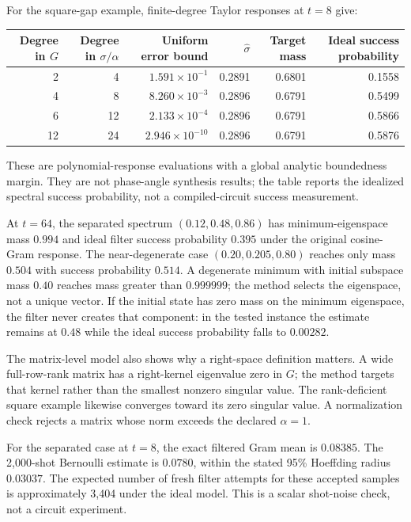 \documentclass[11pt]{article}
\begin{document}
For the square-gap example, finite-degree Taylor responses at $t=8$ give:
\begin{center}
\small
\begin{tabular}{rrrrrr}
\toprule
Degree in $G$ & Degree in $\sigma/\alpha$ & Uniform error bound & $\widehat\sigma$ & Target mass & Ideal success probability\\
\midrule
2 & 4 & $1.591\times10^{-1}$ & 0.2891 & 0.6801 & 0.1558\\
4 & 8 & $8.260\times10^{-3}$ & 0.2896 & 0.6791 & 0.5499\\
6 & 12 & $2.133\times10^{-4}$ & 0.2896 & 0.6791 & 0.5866\\
12 & 24 & $2.946\times10^{-10}$ & 0.2896 & 0.6791 & 0.5876\\
\bottomrule
\end{tabular}
\end{center}
\noindent These are polynomial-response evaluations with a global analytic boundedness margin. They are not phase-angle synthesis results; the table reports the idealized spectral success probability, not a compiled-circuit success measurement.

At $t=64$, the separated spectrum $(0.12,0.48,0.86)$ has minimum-eigenspace mass $0.994$ and ideal filter success probability $0.395$ under the original cosine-Gram response. The near-degenerate case $(0.20,0.205,0.80)$ reaches only mass $0.504$ with success probability $0.514$. A degenerate minimum with initial subspace mass $0.40$ reaches mass greater than $0.999999$; the method selects the eigenspace, not a unique vector. If the initial state has zero mass on the minimum eigenspace, the filter never creates that component: in the tested instance the estimate remains at $0.48$ while the ideal success probability falls to $0.00282$.

The matrix-level model also shows why a right-space definition matters. A wide full-row-rank matrix has a right-kernel eigenvalue zero in $G$; the method targets that kernel rather than the smallest nonzero singular value. The rank-deficient square example likewise converges toward its zero singular value. A normalization check rejects a matrix whose norm exceeds the declared $\alpha=1$.

For the separated case at $t=8$, the exact filtered Gram mean is $0.08385$. The 2,000-shot Bernoulli estimate is $0.0780$, within the stated 95\% Hoeffding radius $0.03037$. The expected number of fresh filter attempts for these accepted samples is approximately 3,404 under the ideal model. This is a scalar shot-noise check, not a circuit experiment.
\end{document}
